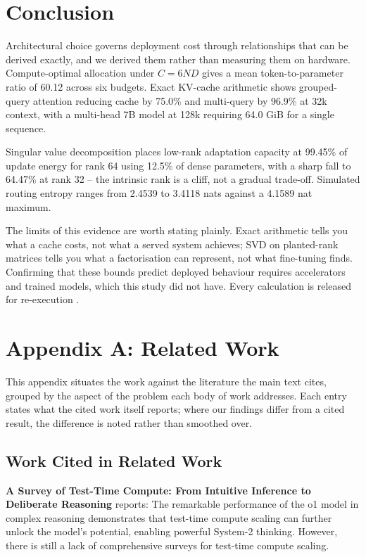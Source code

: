 \documentclass[11pt,a4paper]{article}
\begin{document}
\section{Conclusion}


Architectural choice governs deployment cost through relationships that can be derived exactly, and we derived them rather than measuring them on hardware. Compute-optimal allocation under $C = 6ND$ gives a mean token-to-parameter ratio of 60.12 across six budgets. Exact KV-cache arithmetic shows grouped-query attention reducing cache by 75.0\% and multi-query by 96.9\% at 32k context, with a multi-head 7B model at 128k requiring 64.0 GiB for a single sequence.

Singular value decomposition places low-rank adaptation capacity at 99.45\% of update energy for rank 64 using 12.5\% of dense parameters, with a sharp fall to 64.47\% at rank 32 -- the intrinsic rank is a cliff, not a gradual trade-off. Simulated routing entropy ranges from 2.4539 to 3.4118 nats against a 4.1589 nat maximum.

The limits of this evidence are worth stating plainly. Exact arithmetic tells you what a cache costs, not what a served system achieves; SVD on planted-rank matrices tells you what a factorisation can represent, not what fine-tuning finds. Confirming that these bounds predict deployed behaviour requires accelerators and trained models, which this study did not have. Every calculation is released for re-execution \cite{arxiv_2406_00584,crossref_10_1201_9788743808145_14}.





\section{Appendix A: Related Work}


This appendix situates the work against the literature the main text cites, grouped by the aspect of the problem each body of work addresses. Each entry states what the cited work itself reports; where our findings differ from a cited result, the difference is noted rather than smoothed over.


\subsection{Work Cited in Related Work}


\textbf{A Survey of Test-Time Compute: From Intuitive Inference to Deliberate Reasoning} \cite{arxiv_2501_02497} reports: The remarkable performance of the o1 model in complex reasoning demonstrates that test-time compute scaling can further unlock the model's potential, enabling powerful System-2 thinking. However, there is still a lack of comprehensive surveys for test-time compute scaling.
\end{document}
